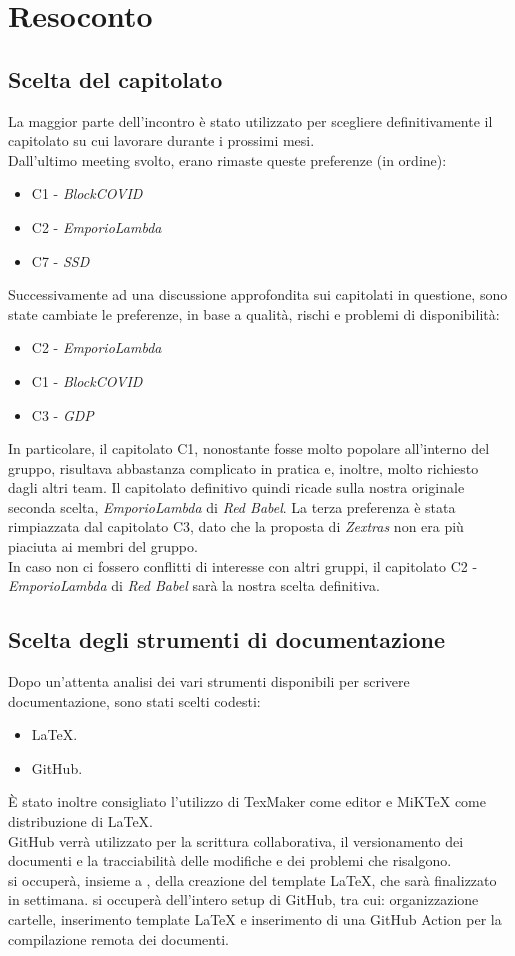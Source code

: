 \section{Resoconto}
\subsection{Scelta del capitolato}
La maggior parte dell'incontro è stato utilizzato per scegliere definitivamente il capitolato su cui lavorare durante i prossimi mesi.\\
Dall'ultimo meeting svolto, erano rimaste queste preferenze (in ordine):
\begin{itemize}
\item C1 - \textit{BlockCOVID}
\item C2 - \textit{EmporioLambda}
\item C7 - \textit{SSD}
\end{itemize}
Successivamente ad una discussione approfondita sui capitolati in questione, sono state cambiate le preferenze, in base a qualità, rischi e problemi di disponibilità:
\begin{itemize}
\item C2 - \textit{EmporioLambda}
\item C1 - \textit{BlockCOVID}
\item C3 - \textit{GDP}
\end{itemize}
In particolare, il capitolato C1, nonostante fosse molto popolare all'interno del gruppo, risultava abbastanza complicato in pratica e, inoltre, molto richiesto dagli altri team. Il capitolato definitivo quindi ricade sulla nostra originale seconda scelta, \textit{EmporioLambda} di \textit{Red Babel}. La terza preferenza è stata rimpiazzata dal capitolato C3, dato che la proposta di \textit{Zextras} non era più piaciuta ai membri del gruppo.\\
In caso non ci fossero conflitti di interesse con altri gruppi, il capitolato C2 - \textit{EmporioLambda} di \textit{Red Babel} sarà la nostra scelta definitiva.
\subsection{Scelta degli strumenti di documentazione}
Dopo un'attenta analisi dei vari strumenti disponibili per scrivere documentazione, sono stati scelti codesti:
\begin{itemize}
\item \LaTeX {}.
\item GitHub.
\end{itemize}
È stato inoltre consigliato l'utilizzo di TexMaker come editor e MiKTeX come distribuzione di \LaTeX {}.\\
GitHub verrà utilizzato per la scrittura collaborativa, il versionamento dei documenti e la tracciabilità delle modifiche e dei problemi che risalgono.\\
\SB{} si occuperà, insieme a \NM{}, della creazione del template \LaTeX {}, che sarà finalizzato in settimana.
\NM{} si occuperà dell'intero setup di GitHub, tra cui: organizzazione cartelle, inserimento template \LaTeX{} e inserimento di una GitHub Action per la compilazione remota dei documenti.
